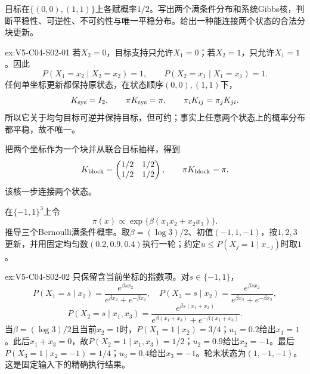 \begin{SLChapterExercisePairSection}
\begin{exercise}\label{ex:V5-C04-S02-01}
目标在$\{(0,0),(1,1)\}$上各赋概率$1/2$。写出两个满条件分布和系统Gibbs核，判断平稳性、可逆性、不可约性与唯一平稳分布。给出一种能连接两个状态的合法分块更新。
\end{exercise}
\ifSLFullEdition
{}\label{sol:V5-C04-S02-01}
\begin{chapterexercisesolution}{ex:V5-C04-S02-01}
若$X_2=0$，目标支持只允许$X_1=0$；若$X_2=1$，只允许$X_1=1$。因此
\[
P(X_1=x_2\mid X_2=x_2)=1,\qquad
P(X_2=x_1\mid X_1=x_1)=1.
\]
任何单坐标更新都保持原状态，在状态顺序$(0,0),(1,1)$下，
\[
K_{\rm sys}=I_2,\qquad
\pi K_{\rm sys}=\pi,\qquad
\pi_iK_{ij}=\pi_jK_{ji}.
\]
所以它关于均匀目标可逆并保持目标，但可约；事实上任意两个状态上的概率分布都平稳，故不唯一。

把两个坐标作为一个块并从联合目标抽样，得到
\[
K_{\rm block}
=\begin{pmatrix}1/2&1/2\\1/2&1/2\end{pmatrix},
\qquad \pi K_{\rm block}=\pi.
\]
该核一步连接两个状态。
\end{chapterexercisesolution}
\fi

\begin{exercise}\label{ex:V5-C04-S02-02}
在$\{-1,1\}^3$上令
\[
\pi(x)\propto\exp\{\beta(x_1x_2+x_2x_3)\}.
\]
推导三个Bernoulli满条件概率。取$\beta=(\log3)/2$、初值$(-1,1,-1)$，按$1,2,3$更新，并用固定均匀数$(0.2,0.9,0.4)$执行一轮；约定$u\le P(X_j=1\mid x_{-j})$时取$1$。
\end{exercise}
\ifSLFullEdition
{}\label{sol:V5-C04-S02-02}
\begin{chapterexercisesolution}{ex:V5-C04-S02-02}
只保留含当前坐标的指数项。对$s\in\{-1,1\}$，
\[
P(X_1=s\mid x_2)
=\frac{e^{\beta s x_2}}{e^{\beta x_2}+e^{-\beta x_2}},
\quad
P(X_3=s\mid x_2)
=\frac{e^{\beta s x_2}}{e^{\beta x_2}+e^{-\beta x_2}},
\]
\[
P(X_2=s\mid x_1,x_3)
=\frac{e^{\beta s(x_1+x_3)}}
{e^{\beta(x_1+x_3)}+e^{-\beta(x_1+x_3)}}.
\]
当$\beta=(\log3)/2$且当前$x_2=1$时，$P(X_1=1\mid x_2)=3/4$；$u_1=0.2$给出$x_1=1$。此后$x_1+x_3=0$，故$P(X_2=1\mid x_1,x_3)=1/2$；$u_2=0.9$给出$x_2=-1$。最后$P(X_3=1\mid x_2=-1)=1/4$；$u_3=0.4$给出$x_3=-1$。轮末状态为$(1,-1,-1)$。这是固定输入下的精确执行结果。
\end{chapterexercisesolution}
\fi


\end{SLChapterExercisePairSection}
